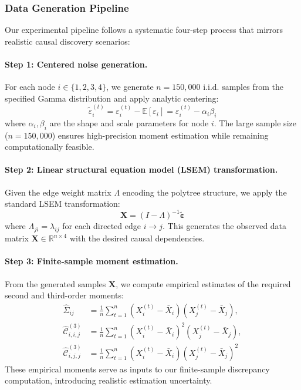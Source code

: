 \documentclass[11pt,a4paper]{article}
\numberwithin{equation}{section}
\begin{document}
\subsubsection{Data Generation Pipeline}

Our experimental pipeline follows a systematic four-step process that mirrors realistic causal discovery scenarios:

\paragraph{Step 1: Centered noise generation.} For each node $i \in \{1,2,3,4\}$, we generate $n = 150{,}000$ i.i.d. samples from the specified Gamma distribution and apply analytic centering:
\begin{equation}
\tilde{\varepsilon}_i^{(t)} = \varepsilon_i^{(t)} - \mathbb{E}[\varepsilon_i] = \varepsilon_i^{(t)} - \alpha_i \beta_i
\end{equation}
where $\alpha_i, \beta_i$ are the shape and scale parameters for node $i$. The large sample size ($n = 150{,}000$) ensures high-precision moment estimation while remaining computationally feasible.

\paragraph{Step 2: Linear structural equation model (LSEM) transformation.} Given the edge weight matrix $\Lambda$ encoding the polytree structure, we apply the standard LSEM transformation:
\begin{equation}
\mathbf{X} = (I - \Lambda)^{-1} \tilde{\boldsymbol{\varepsilon}}
\end{equation}
where $\Lambda_{ji} = \lambda_{ij}$ for each directed edge $i \to j$. This generates the observed data matrix $\mathbf{X} \in \mathbb{R}^{n \times 4}$ with the desired causal dependencies.

\paragraph{Step 3: Finite-sample moment estimation.} From the generated samples $\mathbf{X}$, we compute empirical estimates of the required second and third-order moments:
\begin{align}
\hat{\Sigma}_{ij} &= \frac{1}{n} \sum_{t=1}^n (X_i^{(t)} - \bar{X}_i)(X_j^{(t)} - \bar{X}_j), \\
\hat{\mathcal{C}}^{(3)}_{i,i,j} &= \frac{1}{n} \sum_{t=1}^n (X_i^{(t)} - \bar{X}_i)^2 (X_j^{(t)} - \bar{X}_j), \\
\hat{\mathcal{C}}^{(3)}_{i,j,j} &= \frac{1}{n} \sum_{t=1}^n (X_i^{(t)} - \bar{X}_i) (X_j^{(t)} - \bar{X}_j)^2
\end{align}
These empirical moments serve as inputs to our finite-sample discrepancy computation, introducing realistic estimation uncertainty.
\end{document}
